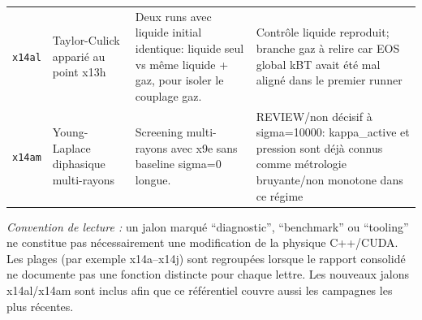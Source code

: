 \documentclass[a4paper,9pt]{article}
\begin{document}
\begin{landscape}
\begin{longtable}{L{2.35cm} L{5.3cm} L{13.25cm} L{4.75cm}}
\texttt{x14al} & Taylor-Culick apparié au point x13h & Deux runs avec liquide initial identique: liquide seul vs même liquide + gaz, pour isoler le couplage gaz. & Contrôle liquide reproduit; branche gaz à relire car EOS global kBT avait été mal aligné dans le premier runner \\
\texttt{x14am} & Young-Laplace diphasique multi-rayons & Screening multi-rayons avec x9e sans baseline sigma=0 longue. & REVIEW/non décisif à sigma=10000: kappa\_active et pression sont déjà connus comme métrologie bruyante/non monotone dans ce régime \\
\end{longtable}
\vspace{1mm}
{\scriptsize\textit{Convention de lecture :} un jalon marqué ``diagnostic'', ``benchmark'' ou ``tooling'' ne constitue pas nécessairement une modification de la physique C++/CUDA. Les plages (par exemple x14a--x14j) sont regroupées lorsque le rapport consolidé ne documente pas une fonction distincte pour chaque lettre. Les nouveaux jalons x14al/x14am sont inclus afin que ce référentiel couvre aussi les campagnes les plus récentes.}
\end{landscape}
\end{document}
